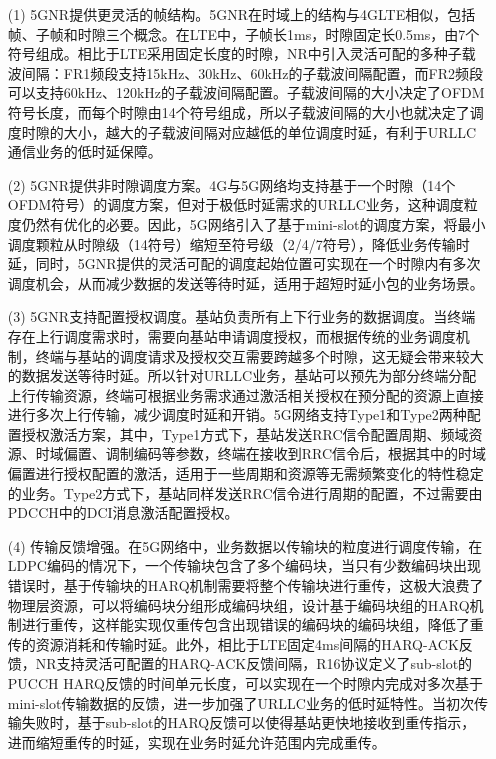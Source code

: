 \documentclass[12pt,a4paper,oneside]{article}
\begin{document}
\begin{enumerate}
    \item[(1)] 5GNR提供更灵活的帧结构。5GNR在时域上的结构与4GLTE相似，包括帧、子帧和时隙三个概念。在LTE中，子帧长1ms，时隙固定长0.5ms，由7个符号组成。相比于LTE采用固定长度的时隙，NR中引入灵活可配的多种子载波间隔：FR1频段支持15kHz、30kHz、60kHz的子载波间隔配置，而FR2频段可以支持60kHz、120kHz的子载波间隔配置。子载波间隔的大小决定了OFDM符号长度，而每个时隙由14个符号组成，所以子载波间隔的大小也就决定了调度时隙的大小，越大的子载波间隔对应越低的单位调度时延，有利于URLLC通信业务的低时延保障。
    \item[(2)] 5GNR提供非时隙调度方案。4G与5G网络均支持基于一个时隙（14个OFDM符号）的调度方案，但对于极低时延需求的URLLC业务，这种调度粒度仍然有优化的必要。因此，5G网络引入了基于mini-slot的调度方案，将最小调度颗粒从时隙级（14符号）缩短至符号级（2/4/7符号），降低业务传输时延，同时，5GNR提供的灵活可配的调度起始位置可实现在一个时隙内有多次调度机会，从而减少数据的发送等待时延，适用于超短时延小包的业务场景。
    \item[(3)] 5GNR支持配置授权调度。基站负责所有上下行业务的数据调度。当终端存在上行调度需求时，需要向基站申请调度授权，而根据传统的业务调度机制，终端与基站的调度请求及授权交互需要跨越多个时隙，这无疑会带来较大的数据发送等待时延。所以针对URLLC业务，基站可以预先为部分终端分配上行传输资源，终端可根据业务需求通过激活相关授权在预分配的资源上直接进行多次上行传输，减少调度时延和开销。5G网络支持Type1和Type2两种配置授权激活方案，其中，Type1方式下，基站发送RRC信令配置周期、频域资源、时域偏置、调制编码等参数，终端在接收到RRC信令后，根据其中的时域偏置进行授权配置的激活，适用于一些周期和资源等无需频繁变化的特性稳定的业务。Type2方式下，基站同样发送RRC信令进行周期的配置，不过需要由PDCCH中的DCI消息激活配置授权。
    \item[(4)] 传输反馈增强。在5G网络中，业务数据以传输块的粒度进行调度传输，在LDPC编码的情况下，一个传输块包含了多个编码块，当只有少数编码块出现错误时，基于传输块的HARQ机制需要将整个传输块进行重传，这极大浪费了物理层资源，可以将编码块分组形成编码块组，设计基于编码块组的HARQ机制进行重传，这样能实现仅重传包含出现错误的编码块的编码块组，降低了重传的资源消耗和传输时延。此外，相比于LTE固定4ms间隔的HARQ-ACK反馈，NR支持灵活可配置的HARQ-ACK反馈间隔，R16协议定义了sub-slot的PUCCH HARQ反馈的时间单元长度，可以实现在一个时隙内完成对多次基于mini-slot传输数据的反馈，进一步加强了URLLC业务的低时延特性。当初次传输失败时，基于sub-slot的HARQ反馈可以使得基站更快地接收到重传指示，进而缩短重传的时延，实现在业务时延允许范围内完成重传。

\end{enumerate}
\end{document}
